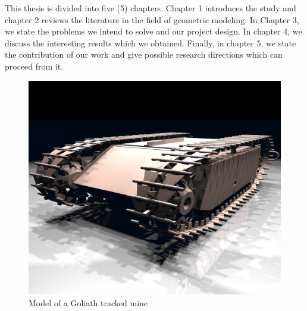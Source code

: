 This thesis is divided into five (5) chapters. Chapter 1 introduces the study and chapter 2 reviews the literature in the field of geometric modeling. In Chapter 3, we state the problems we intend to solve and our project design. In chapter 4, we discuss the interesting results which we obtained. Finally, in
chapter 5, we state the contribution of our work and give possible research
directions which can proceed from it.


\begin{figure}[htbp]
\centering
\includegraphics[trim=1cm 2cm 3cm 4cm, clip=true, totalheight=0.5\textheight]{Figures/Goliath.png}
\caption[Model of a Goliath tracked mine]{Model of a Goliath tracked mine}
\label{Goliath}
\end{figure}

